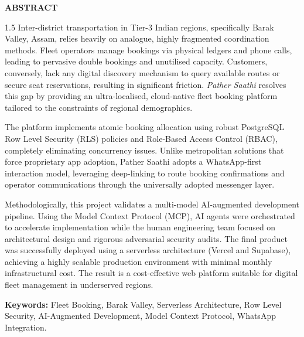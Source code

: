 \documentclass[12pt, a4paper, oneside]{report}
\begin{document}
\newpage
\thispagestyle{empty}
\begin{center}
    {\Huge \textbf{ABSTRACT}}\par
    \vspace{1.5cm}
\end{center}

\begin{spacing}{1.5}
Inter-district transportation in Tier-3 Indian regions, specifically Barak Valley, Assam, relies heavily on analogue, highly fragmented coordination methods. Fleet operators manage bookings via physical ledgers and phone calls, leading to pervasive double bookings and unutilised capacity. Customers, conversely, lack any digital discovery mechanism to query available routes or secure seat reservations, resulting in significant friction. \textit{Pather Saathi} resolves this gap by providing an ultra-localised, cloud-native fleet booking platform tailored to the constraints of regional demographics. 

The platform implements atomic booking allocation using robust PostgreSQL Row Level Security (RLS) policies and Role-Based Access Control (RBAC), completely eliminating concurrency issues. Unlike metropolitan solutions that force proprietary app adoption, Pather Saathi adopts a WhatsApp-first interaction model, leveraging deep-linking to route booking confirmations and operator communications through the universally adopted messenger layer.

Methodologically, this project validates a multi-model AI-augmented development pipeline. Using the Model Context Protocol (MCP), AI agents were orchestrated to accelerate implementation while the human engineering team focused on architectural design and rigorous adversarial security audits. The final product was successfully deployed using a serverless architecture (Vercel and Supabase), achieving a highly scalable production environment with minimal monthly infrastructural cost. The result is a cost-effective web platform suitable for digital fleet management in underserved regions.

\vspace{1cm}
\textbf{Keywords:} Fleet Booking, Barak Valley, Serverless Architecture, Row Level Security, AI-Augmented Development, Model Context Protocol, WhatsApp Integration.
\end{spacing}

\newpage
{}
\renewcommand{\cftchapfont}{\bfseries\color{darkgray}}
\renewcommand{\cftchappagefont}{\bfseries\color{brandteal}}
\renewcommand{\cftsecfont}{\normalfont\color{darkgray}}
\renewcommand{\cftchapleader}{\cftdotfill{\cftdotsep}}
\end{document}
